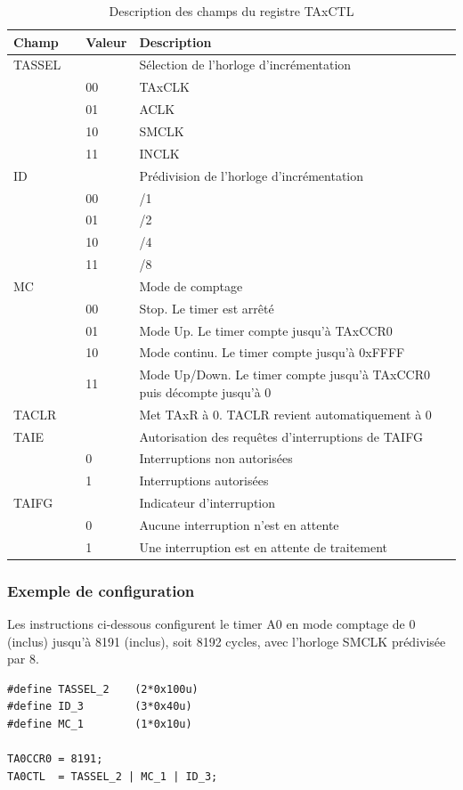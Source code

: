 \begin{table}[h]
\centering 
\begin{tabular}{l l l l}
\hline\hline
Champ & & Valeur & Description \\ %
\hline
TASSEL & & & Sélection de l'horloge d'incrémentation  \\
& & 00 & TAxCLK  \\
& & 01 & ACLK  \\
& & 10 & SMCLK  \\
& & 11 & INCLK  \\
\hline
ID & & & Prédivision de l'horloge d'incrémentation  \\
& & 00 & /1  \\
& & 01 & /2  \\
& & 10 & /4  \\
& & 11 & /8  \\
\hline
MC & & & Mode de comptage  \\
& & 00 & Stop. Le timer est arrêté  \\
& & 01 & Mode Up. Le timer compte jusqu'à TAxCCR0  \\
& & 10 & Mode continu. Le timer compte jusqu'à 0xFFFF  \\
& & 11 & Mode Up/Down. Le timer compte jusqu'à TAxCCR0 puis décompte jusqu'à 0  \\
\hline
TACLR & & & Met TAxR à 0. TACLR revient automatiquement à 0 \\
\hline
TAIE & & & Autorisation des requêtes d'interruptions de TAIFG \\
& & 0 & Interruptions non autorisées \\
& & 1 & Interruptions autorisées \\
\hline
TAIFG & & & Indicateur d'interruption \\
& & 0 & Aucune interruption n'est en attente \\
& & 1 & Une interruption est en attente de traitement \\
\hline
\end{tabular}
\caption{Description des champs du registre TAxCTL}
\label{table:TAxCTL}
\end{table}

\begin{minipage}{14cm}{
\subsubsection*{Exemple de configuration}
Les instructions ci-dessous configurent le timer A0 en mode comptage de 0 (inclus) jusqu'à 8191 (inclus), soit 8192 cycles, avec l'horloge SMCLK prédivisée par 8.

\lstset{style=customc}
\begin{lstlisting}
#define TASSEL_2	(2*0x100u)
#define ID_3		(3*0x40u)
#define MC_1		(1*0x10u)

TA0CCR0 = 8191;
TA0CTL  = TASSEL_2 | MC_1 | ID_3;
\end{lstlisting}
}
\end{minipage}

